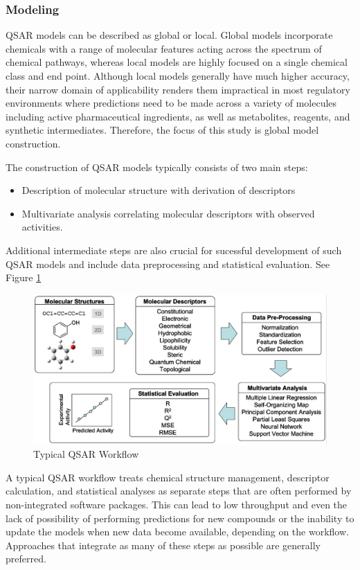 \subsubsection{Modeling}
QSAR models can be described as global or local. Global models incorporate chemicals with a range of molecular features acting across the spectrum of chemical pathways, whereas local models are highly focused on a single chemical class and end point. Although local models generally have much higher accuracy, their narrow domain of applicability renders them impractical in most regulatory environments where predictions need to be made across a variety of molecules including active pharmaceutical ingredients, as well as metabolites, reagents, and synthetic intermediates. \cite{Kruhlak2012} Therefore, the focus of this study is global model construction.

The construction of QSAR models typically consists of two main steps:
\begin{itemize}
\item Description of molecular structure with derivation of descriptors
\item Multivariate analysis correlating molecular descriptors with observed activities. 
\end{itemize}
Additional intermediate steps are also crucial for sucessful development of such QSAR models and include data preprocessing and statistical evaluation. See Figure \ref{fig:QSARworkflow} \cite{Nantasenamat2009}

\begin{figure}[h,t]
  \centering
  \includegraphics[width=1\textwidth]{../img/SchematicQSAR.png}
  \caption[Typical QSAR Workflow]{Typical QSAR Workflow \cite{Nantasenamat2009}}
  \label{fig:QSARworkflow}
\end{figure}

A typical QSAR workflow treats chemical structure management, descriptor calculation, and statistical analyses as separate steps that are often performed by non-integrated software packages. This can lead to low throughput and even the lack of possibility of performing predictions for new compounds or the inability to update the models when new data become available, depending on the workflow. Approaches that integrate as many of these steps as possible are generally preferred.

